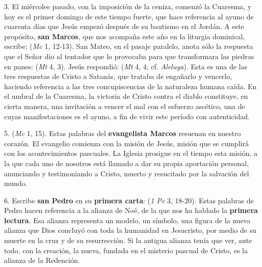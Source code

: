 \begin{body}
3. El miércoles pasado, con la imposición de la ceniza, comenzó la Cuaresma, y hoy es el primer domingo de este tiempo fuerte, que hace referencia al ayuno de cuarenta días que Jesús empezó después de su bautismo en el Jordán. A este propósito, \textbf{san Marcos}, que nos acompaña este año en la liturgia dominical, escribe:  (\textit{Mc} 1, 12-13). San Mateo, en el pasaje paralelo, anota sólo la respuesta que el Señor dio al tentador que lo provocaba para que transformara las piedras en panes:  (\textit{Mt} 4, 3). Jesús respondió:  (\textit{Mt} 4, 4; cf. \textit{Aleluya}). Esta es una de las tres respuestas de Cristo a Satanás, que trataba de engañarlo y vencerlo, haciendo referencia a las tres concupiscencias de la naturaleza humana caída. En el umbral de la Cuaresma, la victoria de Cristo contra el diablo constituye, en cierta manera, una invitación a vencer el mal con el esfuerzo ascético, una de cuyas manifestaciones es el ayuno, a fin de vivir este período con autenticidad. \txtsmall{[\ldots]}

5.  (\textit{Mc} 1, 15). Estas palabras del \textbf{evangelista Marcos} resuenan en nuestro corazón. El evangelio comienza con la misión de Jesús, misión que se cumplirá con los acontecimientos pascuales. La Iglesia prosigue en el tiempo esta misión, a la que cada uno de nosotros está llamado a dar su propia aportación personal, anunciando y testimoniando a Cristo, muerto y resucitado por la salvación del mundo. \txtsmall{[\ldots]}

6. Escribe \textbf{san Pedro} en su \textbf{primera carta}:  (\textit{1 Pe} 3, 18-20). Estas palabras de Pedro hacen referencia a la alianza de Noé, de la que nos ha hablado la \textbf{primera lectura}. Esa alianza representa un modelo, un símbolo, una figura de la nueva alianza que Dios concluyó con toda la humanidad en Jesucristo, por medio de su muerte en la cruz y de su resurrección. Si la antigua alianza tenía que ver, ante todo, con la creación, la nueva, fundada en el misterio pascual de Cristo, es la alianza de la Redención.


\end{body}
